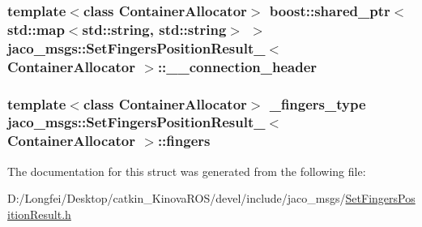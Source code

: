\subsubsection[{\texorpdfstring{\+\_\+\+\_\+connection\+\_\+header}{__connection_header}}]{\setlength{\rightskip}{0pt plus 5cm}template$<$class Container\+Allocator$>$ boost\+::shared\+\_\+ptr$<$std\+::map$<$std\+::string, std\+::string$>$ $>$ {\bf jaco\+\_\+msgs\+::\+Set\+Fingers\+Position\+Result\+\_\+}$<$ Container\+Allocator $>$\+::\+\_\+\+\_\+connection\+\_\+header}\hypertarget{structjaco__msgs_1_1SetFingersPositionResult___a967d4436a5b01551b8c0feffb1abefbd}{}\label{structjaco__msgs_1_1SetFingersPositionResult___a967d4436a5b01551b8c0feffb1abefbd}
\subsubsection[{\texorpdfstring{fingers}{fingers}}]{\setlength{\rightskip}{0pt plus 5cm}template$<$class Container\+Allocator$>$ {\bf \+\_\+fingers\+\_\+type} {\bf jaco\+\_\+msgs\+::\+Set\+Fingers\+Position\+Result\+\_\+}$<$ Container\+Allocator $>$\+::fingers}\hypertarget{structjaco__msgs_1_1SetFingersPositionResult___a5c4ac8ab3df0087e2ea584f4b419e91a}{}\label{structjaco__msgs_1_1SetFingersPositionResult___a5c4ac8ab3df0087e2ea584f4b419e91a}


The documentation for this struct was generated from the following file\+:\begin{DoxyCompactItemize}
\item 
D\+:/\+Longfei/\+Desktop/catkin\+\_\+\+Kinova\+R\+O\+S/devel/include/jaco\+\_\+msgs/\hyperlink{SetFingersPositionResult_8h}{Set\+Fingers\+Position\+Result.\+h}\end{DoxyCompactItemize}
